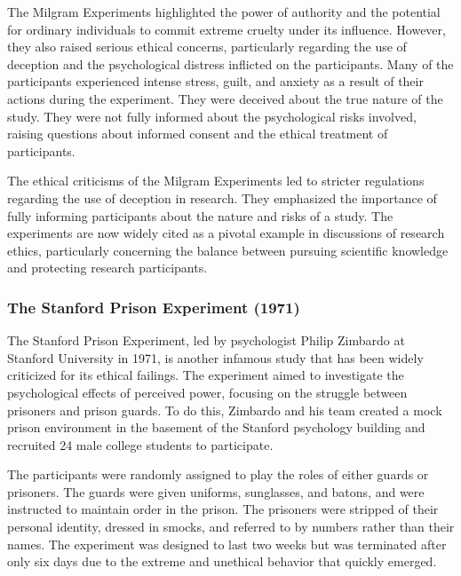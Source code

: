 \documentclass[
]{book}
\begin{document}
The Milgram Experiments highlighted the power of authority and the potential for ordinary individuals to commit extreme cruelty under its influence. However, they also raised serious ethical concerns, particularly regarding the use of deception and the psychological distress inflicted on the participants. Many of the participants experienced intense stress, guilt, and anxiety as a result of their actions during the experiment. They were deceived about the true nature of the study. They were not fully informed about the psychological risks involved, raising questions about informed consent and the ethical treatment of participants.

The ethical criticisms of the Milgram Experiments led to stricter regulations regarding the use of deception in research. They emphasized the importance of fully informing participants about the nature and risks of a study. The experiments are now widely cited as a pivotal example in discussions of research ethics, particularly concerning the balance between pursuing scientific knowledge and protecting research participants.

\subsubsection*{The Stanford Prison Experiment (1971)}\label{the-stanford-prison-experiment-1971}

The Stanford Prison Experiment, led by psychologist Philip Zimbardo at Stanford University in 1971, is another infamous study that has been widely criticized for its ethical failings. The experiment aimed to investigate the psychological effects of perceived power, focusing on the struggle between prisoners and prison guards. To do this, Zimbardo and his team created a mock prison environment in the basement of the Stanford psychology building and recruited 24 male college students to participate.

The participants were randomly assigned to play the roles of either guards or prisoners. The guards were given uniforms, sunglasses, and batons, and were instructed to maintain order in the prison. The prisoners were stripped of their personal identity, dressed in smocks, and referred to by numbers rather than their names. The experiment was designed to last two weeks but was terminated after only six days due to the extreme and unethical behavior that quickly emerged.
\end{document}
